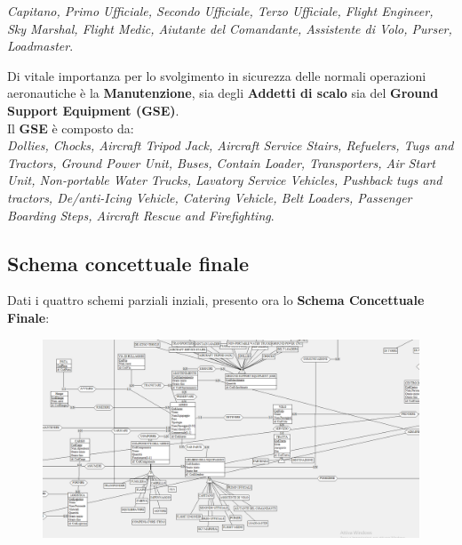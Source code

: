 \textsf{\small \emph{Capitano, Primo Ufficiale, Secondo Ufficiale, Terzo Ufficiale, Flight Engineer, Sky Marshal, Flight Medic, Aiutante del Comandante, Assistente di Volo, Purser, Loadmaster}.} \break

\textsf{\small Di vitale importanza per lo svolgimento in sicurezza delle normali operazioni aeronautiche è la \textbf{Manutenzione}, sia degli \textbf{Addetti di scalo} sia del \textbf{Ground Support Equipment (GSE)}.}\\

\textsf{\small Il \textbf{GSE} è composto da: }\\

\textsf{\small \emph{ Dollies, Chocks, Aircraft Tripod Jack, Aircraft Service Stairs, Refuelers, Tugs and Tractors, Ground Power Unit, Buses, Contain Loader, Transporters, Air Start Unit, Non-portable Water Trucks, Lavatory Service Vehicles, Pushback tugs and tractors, De/anti-Icing Vehicle, Catering Vehicle, Belt Loaders, Passenger Boarding Steps, Aircraft Rescue and Firefighting}.}\\


\subsection{Schema concettuale finale}

\textsf{\small Dati i quattro schemi parziali inziali, presento ora lo \textbf{Schema Concettuale Finale}:}\\



\begin{figure}
	\includegraphics[width=1.2\textwidth]{./img/Schema_Finale1.png} %
	\caption{}
	\label{fig:s1}
\end{figure}

